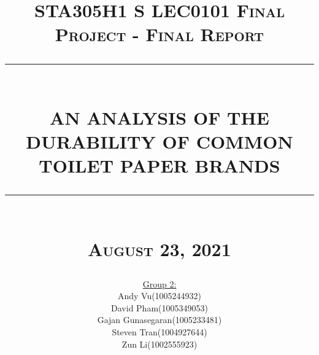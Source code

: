
\newcommand{\HRule}[1]{\rule{\linewidth}{#1}}
\onehalfspacing
\setcounter{tocdepth}{5}
\setcounter{secnumdepth}{5}

\setcounter{page}{0}

\title{ \normalsize \textsc{STA305H1 S LEC0101 Final Project - Final Report}
		\\ [2.0cm]
		\HRule{0.5pt} \\
		\LARGE \textbf{\uppercase{An analysis of the durability of common toilet paper brands}}
		\HRule{2pt} \\ [0.5cm]
		\normalsize \textsc{August  23, 2021} \vspace*{5\baselineskip}}

\date{}

\author{
\begin{tabular}{l r}
		\underline{Group 2:}&  \\
		Andy Vu & (1005244932) \\
		David Pham & (1005349053) \\
		Gajan Gunasegaran & (1005233481) \\
		Steven Tran & (1004927644) \\
		Zun Li & (1002555923)
\end{tabular}}

\maketitle
\thispagestyle{empty} 
\newpage
